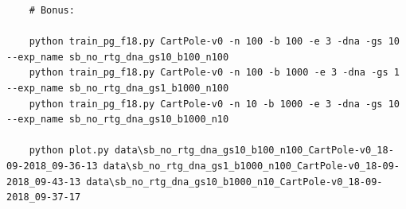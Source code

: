 \documentclass[12pt]{article}
\begin{document}
	\begin{minipage}{\linewidth}
	\begin{lstlisting}
	# Bonus:
	
	python train_pg_f18.py CartPole-v0 -n 100 -b 100 -e 3 -dna -gs 10 --exp_name sb_no_rtg_dna_gs10_b100_n100
	python train_pg_f18.py CartPole-v0 -n 100 -b 1000 -e 3 -dna -gs 1 --exp_name sb_no_rtg_dna_gs1_b1000_n100
	python train_pg_f18.py CartPole-v0 -n 10 -b 1000 -e 3 -dna -gs 10 --exp_name sb_no_rtg_dna_gs10_b1000_n10
	
	python plot.py data\sb_no_rtg_dna_gs10_b100_n100_CartPole-v0_18-09-2018_09-36-13 data\sb_no_rtg_dna_gs1_b1000_n100_CartPole-v0_18-09-2018_09-43-13 data\sb_no_rtg_dna_gs10_b1000_n10_CartPole-v0_18-09-2018_09-37-17
	\end{lstlisting}
	\end{minipage}
	
\end{document}
